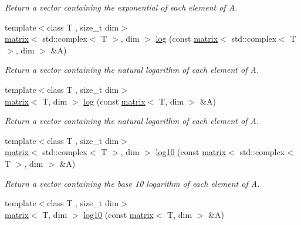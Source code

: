 \begin{DoxyCompactItemize}
\begin{DoxyCompactList}\small\item\em Return a vector containing the exponential of each element of A. \end{DoxyCompactList}\item 
\hypertarget{namespacekeycpp_a0d31321365987f3cadb5e6d3038d2ff6}{{\footnotesize template$<$class T , size\-\_\-t dim$>$ }\\\hyperlink{classkeycpp_1_1matrix}{matrix}$<$ std\-::complex$<$ T $>$, dim $>$ \hyperlink{namespacekeycpp_a0d31321365987f3cadb5e6d3038d2ff6}{log} (const \hyperlink{classkeycpp_1_1matrix}{matrix}$<$ std\-::complex$<$ T $>$, dim $>$ \&A)}\label{namespacekeycpp_a0d31321365987f3cadb5e6d3038d2ff6}

\begin{DoxyCompactList}\small\item\em Return a vector containing the natural logarithm of each element of A. \end{DoxyCompactList}\item 
\hypertarget{namespacekeycpp_a7a235af8108964defc4dc084bec2c7f9}{{\footnotesize template$<$class T , size\-\_\-t dim$>$ }\\\hyperlink{classkeycpp_1_1matrix}{matrix}$<$ T, dim $>$ \hyperlink{namespacekeycpp_a7a235af8108964defc4dc084bec2c7f9}{log} (const \hyperlink{classkeycpp_1_1matrix}{matrix}$<$ T, dim $>$ \&A)}\label{namespacekeycpp_a7a235af8108964defc4dc084bec2c7f9}

\begin{DoxyCompactList}\small\item\em Return a vector containing the natural logarithm of each element of A. \end{DoxyCompactList}\item 
\hypertarget{namespacekeycpp_af5ee080f280e09a893944b33683e3d4d}{{\footnotesize template$<$class T , size\-\_\-t dim$>$ }\\\hyperlink{classkeycpp_1_1matrix}{matrix}$<$ std\-::complex$<$ T $>$, dim $>$ \hyperlink{namespacekeycpp_af5ee080f280e09a893944b33683e3d4d}{log10} (const \hyperlink{classkeycpp_1_1matrix}{matrix}$<$ std\-::complex$<$ T $>$, dim $>$ \&A)}\label{namespacekeycpp_af5ee080f280e09a893944b33683e3d4d}

\begin{DoxyCompactList}\small\item\em Return a vector containing the base 10 logarithm of each element of A. \end{DoxyCompactList}\item 
\hypertarget{namespacekeycpp_a3e6fb67c965ed61d53e3438a65282b97}{{\footnotesize template$<$class T , size\-\_\-t dim$>$ }\\\hyperlink{classkeycpp_1_1matrix}{matrix}$<$ T, dim $>$ \hyperlink{namespacekeycpp_a3e6fb67c965ed61d53e3438a65282b97}{log10} (const \hyperlink{classkeycpp_1_1matrix}{matrix}$<$ T, dim $>$ \&A)}\label{namespacekeycpp_a3e6fb67c965ed61d53e3438a65282b97}


\end{DoxyCompactItemize}
